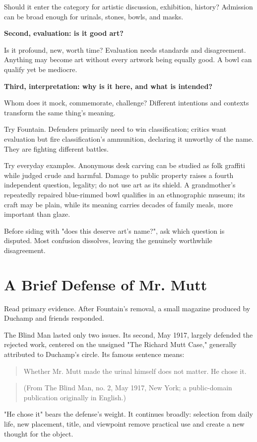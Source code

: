 Should it enter the category for artistic discussion, exhibition, history? Admission can be broad enough for urinals, stones, bowls, and masks.

\textbf{Second, evaluation: is it good art?}

Is it profound, new, worth time? Evaluation needs standards and disagreement. Anything may become art without every artwork being equally good. A bowl can qualify yet be mediocre.

\textbf{Third, interpretation: why is it here, and what is intended?}

Whom does it mock, commemorate, challenge? Different intentions and contexts transform the same thing's meaning.

Try Fountain. Defenders primarily need to win classification; critics want evaluation but fire classification's ammunition, declaring it unworthy of the name. They are fighting different battles.

Try everyday examples. Anonymous desk carving can be studied as folk graffiti while judged crude and harmful. Damage to public property raises a fourth independent question, legality; do not use art as its shield. A grandmother's repeatedly repaired blue-rimmed bowl qualifies in an ethnographic museum; its craft may be plain, while its meaning carries decades of family meals, more important than glaze.

Before siding with "does this deserve art's name?", ask which question is disputed. Most confusion dissolves, leaving the genuinely worthwhile disagreement.

\section{A Brief Defense of Mr. Mutt}
Read primary evidence. After Fountain's removal, a small magazine produced by Duchamp and friends responded.

The Blind Man lasted only two issues. Its second, May 1917, largely defended the rejected work, centered on the unsigned "The Richard Mutt Case," generally attributed to Duchamp's circle. Its famous sentence means:

\begin{quote}
Whether Mr. Mutt made the urinal himself does not matter. He chose it.
\end{quote}
\begin{quote}
(From The Blind Man, no. 2, May 1917, New York; a public-domain publication originally in English.)
\end{quote}
"He chose it" bears the defense's weight. It continues broadly: selection from daily life, new placement, title, and viewpoint remove practical use and create a new thought for the object.

